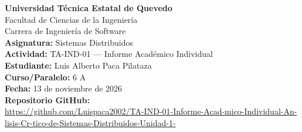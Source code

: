 \documentclass[12pt,a4paper]{article}
\begin{document}
\begin{titlepage}
    \centering
    \vspace*{2cm}
    \Large \textbf{Universidad Técnica Estatal de Quevedo}\\
    \vspace{0.5cm}
    \large Facultad de Ciencias de la Ingeniería\\
    \large Carrera de Ingeniería de Software\\
    \vspace{2cm}
    \textbf{Asignatura:} Sistemas Distribuidos\\
    \textbf{Actividad:} TA-IND-01 — Informe Académico Individual\\
    \vspace{2cm}
    \textbf{Estudiante:} Luis Alberto Paca Pilataza\\
    \textbf{Curso/Paralelo:} 6 A\\
    \textbf{Fecha:} 13 de noviembre de 2026\\
    \vspace{2cm}
    \textbf{Repositorio GitHub:}\\
    {\tiny \url{https://github.com/Luispaca2002/TA-IND-01-Informe-Acad-mico-Individual-An-lisis-Cr-tico-de-Sistemas-Distribuidos-Unidad-1-}}
    \vfill
\end{titlepage}

\begin{abstract}
Este documento presenta un análisis crítico de la arquitectura distribuida de MongoDB, enfocado específicamente en su implementación de Replica Sets para garantizar alta disponibilidad y tolerancia a fallos. Se examina el sistema a través de los conceptos teóricos fundamentales, incluyendo las transparencias de distribución, el modelo de comunicación, y los compromisos arquitectónicos establecidos por los teoremas CAP y PACELC. A diferencia de un análisis puramente documental, este informe se sustenta en la ejecución de un entorno local distribuido mediante contenedores Docker, donde se provocó deliberadamente la caída del nodo primario para observar, medir y documentar el proceso algorítmico de elección de líder y recuperación del clúster. Las conclusiones obtenidas confirman que MongoDB prioriza la consistencia frente a las particiones de red (CP), sacrificando disponibilidad temporal durante los tiempos de elección, lo cual define su idoneidad para entornos donde la integridad transaccional supera la necesidad de latencia absoluta.
\end{abstract}
\end{document}
